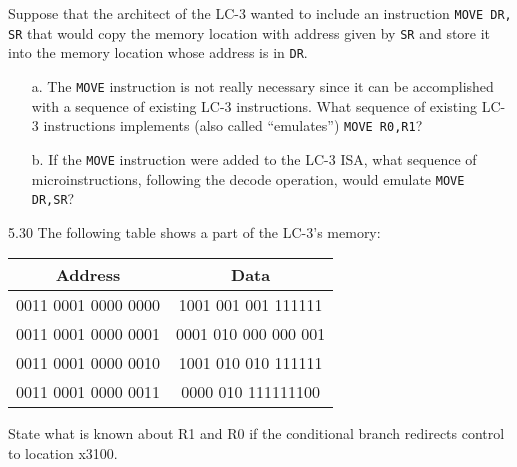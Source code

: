 \documentclass{patt}
\begin{document}
\begin{exercises}
\noindent Suppose that the architect of the LC-3 wanted to include
an instruction \texttt{MOVE DR,} \texttt{SR} that would copy the memory
location with address given by \texttt{SR} and store it into the memory
location whose address is in \texttt{DR}.
\begin{enumerate}[a.]
\item[a.]  The \texttt{MOVE} instruction is not really necessary since it
  can be accomplished with a sequence of existing LC-3 instructions.
  What sequence of existing LC-3 instructions implements (also called
  ``emulates'') \texttt{MOVE R0,R1}?

\item[b.]  If the \texttt{MOVE} instruction were added to the LC-3 ISA,
  what sequence of microinstructions, following the decode operation,
  would emulate \texttt{MOVE DR,SR}?
\end{enumerate}

\enlargethispage{-2\baselineskip}

\item[5.30] The following table shows a part of the LC-3's memory:
\begin{center}
{\fontsize{9}{13pt}\selectfont
{\renewcommand{\tabcolsep}{12pt}
\begin{tabular}{@{}cc@{}} \hline
{Address}\rule{0pt}{10.12pt} & {Data} \\ \hline
           0011 0001 0000 0000 & 1001 001 001 111111\rule{0pt}{10.1pt} \\[3pt]
           0011 0001 0000 0001 & 0001 010 000 000 001 \\[3pt]
           0011 0001 0000 0010 & 1001 010 010 111111 \\[3pt]
           0011 0001 0000 0011 & 0000 010 111111100 \\[2.5pt]\hline
\end{tabular}}}
\vspace{3pt}
\end{center}

\noindent State what is known about R1 and R0 if the conditional
branch redirects control to location x3100.

\newpage


\end{exercises}
\end{document}
